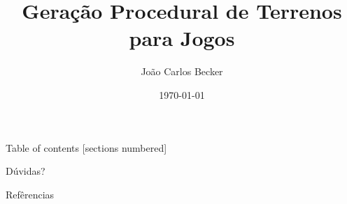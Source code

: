 \documentclass[10pt]{beamer}
\title{Geração Procedural de Terrenos para Jogos}
\date{\today}
\author{João Carlos Becker}
\begin{document}
\maketitle



\begin{frame}{Table of contents}
    [sections numbered]
    \tableofcontents[hideallsubsections]
\end{frame}







\appendix

{
\begin{frame}[standout]
  Dúvidas?
\end{frame}
}

\begin{frame}[allowframebreaks]{Refêrencias}

  
  

\end{frame}
\end{document}
